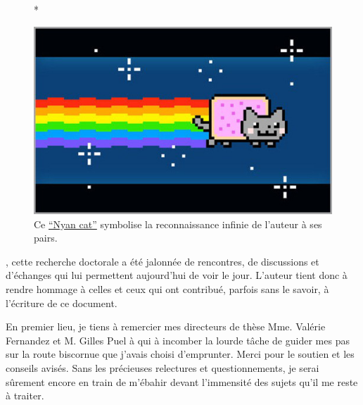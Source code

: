 


    \begin{figure}[th!]*
    
       \hfill\begin{minipage}{8cm}\centering
        \includegraphics[scale=0.6]{media/nyan_cat_thumb.jpg}
        \caption*{Ce \href{https://www.youtube.com/watch?v=QH2-TGUlwu4}{``Nyan cat''} symbolise la reconnaissance infinie de l'auteur à ses pairs.}
        \end{minipage}
    \end{figure}




, cette recherche doctorale a été jalonnée de rencontres, de discussions et d'échanges qui lui permettent aujourd'hui de voir le jour. L'auteur tient donc à rendre hommage à celles et ceux qui ont contribué, parfois sans le savoir, à l'écriture de ce document.

En premier lieu, je tiens à remercier mes directeurs de thèse Mme. Valérie {\sc Fernandez} et M. Gilles {\sc Puel} à qui à incomber la lourde tâche de guider mes pas sur la route biscornue que j'avais choisi d'emprunter. Merci pour le soutien et les conseils avisés. Sans les précieuses relectures et questionnements, je serai sûrement encore en train de m'ébahir devant l'immensité des sujets qu'il me reste à traiter.

